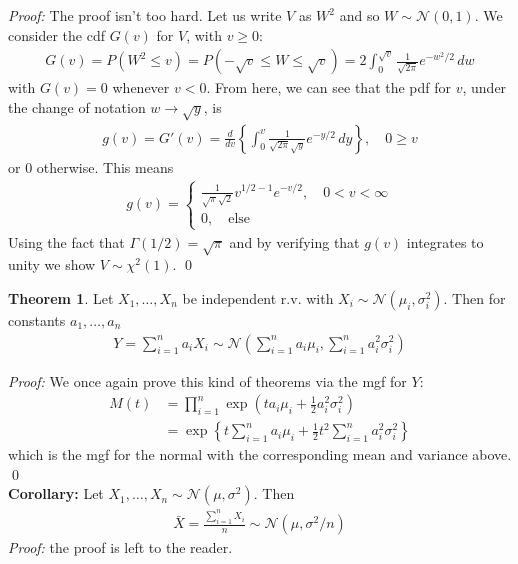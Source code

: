 \documentclass{book}
\theoremstyle{definition}
\newtheorem{thm}{Theorem}[section]
\newcommand{\nn}{\nonumber}
\newcommand{\f}[2]{\frac{#1}{#2}}
\newcommand{\lp}{\left(}
\newcommand{\rp}{\right)}
\newcommand{\lc}{\left\{}
\newcommand{\rc}{\right\}}
\begin{document}
\noindent \textit{Proof:} The proof isn't too hard. Let us write $V$ as $W^2$ and so $W \sim \mathcal{N}(0,1)$.  We consider the cdf $G(v)$ for $V$, with $v \geq 0$:
\begin{align}
G(v) = P( W^2 \leq v) = P( -\sqrt{v} \leq  W  \leq \sqrt{v} ) = 2\int^{\sqrt{v}}_0 \f{1}{ \sqrt{2\pi} } e^{-w^2/2}\,dw
\end{align}
with $G(v) = 0$ whenever $v<0$. From here, we can see that the pdf for $v$, under the change of notation $w \to \sqrt{y}$, is
\begin{align}
g(v) = G'(v) = \f{d}{dv}\lc \int^v_0 \f{1}{\sqrt{2\pi}\sqrt{y}}e^{-y/2}\,dy \rc, \quad 0 \geq v
\end{align}
or $0$ otherwise. This means
\begin{align}
\boxed{g(v) = \begin{cases}
\f{1}{\sqrt{\pi}\sqrt{2}} v^{1/2-1}e^{-v/2}, \quad 0 < v< \infty\\
0, \quad \text{else}
\end{cases}}
\end{align}
Using the fact that $\Gamma(1/2) = \sqrt{\pi}$ and by verifying that $g(v)$ integrates to unity we show $V \sim \chi^2(1)$. \qed\\



\begin{thm} Let $X_1, \dots, X_n$ be independent r.v. with $X_i \sim \mathcal{N}(\mu_i, \sigma_i^2)$. Then for constants $a_1,\dots, a_n$
\begin{align}
\boxed{Y = \sum^n_{i=1}a_i X_i \sim \mathcal{N}\lp \sum^n_{i=1}a_i\mu_i, \sum^n_{i=1}a_i^2\sigma^2_i \rp}
\end{align}
\end{thm}
\noindent \textit{Proof:} We once again prove this kind of theorems via the mgf for $Y$:
\begin{align}
M(t) &= \prod^n_{i=1}\exp\lp ta_i\mu_i + \f{1}{2}a_i^2\sigma_i^2 \rp \nn\\
&= \exp\lc t\sum^n_{i=1}a_i\mu_i + \f{1}{2}t^2\sum^n_{i=1}a_i^2\sigma_i^2 \rc
\end{align}
which is the mgf for the normal with the corresponding mean and variance above. \qed\\


\textbf{Corollary:} Let $X_1, \dots, X_n \sim \mathcal{N}(\mu,\sigma^2)$. Then 
\begin{align}
\boxed{\bar{X} = \f{\sum^n_{i=1} X_i}{n} \sim \mathcal{N}\lp \mu, \sigma^2/n \rp}
\end{align} 
\noindent \textit{Proof:} the proof is left to the reader.
\end{document}
